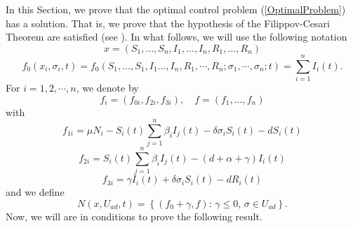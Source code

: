 \documentclass[a4paper,10pt]{article}
\theoremstyle{remark}
\begin{document}
In this Section, we prove that the optimal control problem (\ref{OptimalProblem}) has a solution. That is,  we prove that the hypothesis of the Filippov-Cesari Theorem are satisfied (see \cite{A.Seierstad499}). In what follows, we will use the following notation
$$
x=\left(S_{1}, \ldots, S_{n}, I_{1}, \ldots, I_{n}, R_{1},\ldots, R_{n}\right)
$$
\[f_{0}\left(x_{i}, \sigma_{i}, t\right)=f_{0}\left(S_{1}, \ldots, S_{1}, I_{1}\ldots, I_n, R_{1}, \cdots, R_{n} ; \sigma_{1}, \cdots, \sigma_{n} ; t\right)=\sum_{i=1}^{n} I_{i}(t).\]
For $i=1,2,\cdots, n$, we denote by
$$
f_{i}=\left(f_{0 i}, f_{2 i}, f_{3 i}\right), \quad  f=\left(f_{1}, \ldots, f_{n}\right) 
$$
with
\[f_{1 i}=\mu N_{i}-S_{i}(t) \sum_{j=1}^{n} \beta_{i} I_{j}(t)-\delta \sigma_{i} S_{i}(t)-d S_{i}(t)\]
\[f_{2i}=S_{i}(t) \sum_{j=1}^{n} \beta_{i} I_{j}(t)-(d+\alpha+\gamma) I_{i}(t)\]
\[f_{3 i}=\gamma I_{i}(t)+\delta \sigma_{i} S_{i}(t)-d R_{i}(t)\]
and we define
$$N\left(x, U_{a d}, t\right)=\left\{\left(f_{0}+\gamma, f\right):\, \gamma \leqslant 0,\, \sigma \in U_{a d}\right\}.$$
Now, we will are in conditions to prove the following result.
\end{document}
